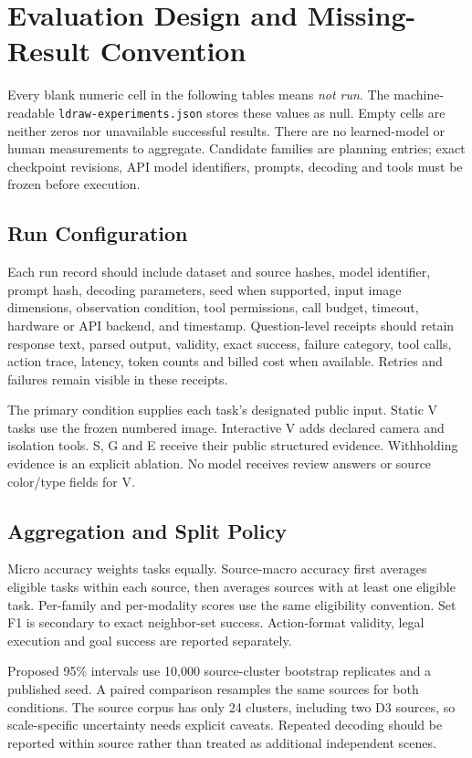 \documentclass[10pt,letterpaper]{article}
\begin{document}
\section{Evaluation Design and Missing-Result Convention}
Every blank numeric cell in the following tables means \emph{not run}.
The machine-readable \texttt{ldraw-experiments.json} stores these values
as null. Empty cells are neither zeros nor unavailable successful
results. There are no learned-model or human measurements to aggregate.
Candidate families are planning entries; exact checkpoint revisions,
API model identifiers, prompts, decoding and tools must be frozen
before execution.

\subsection{Run Configuration}
Each run record should include dataset and source hashes, model
identifier, prompt hash, decoding parameters, seed when supported,
input image dimensions, observation condition, tool permissions,
call budget, timeout, hardware or API backend, and timestamp.
Question-level receipts should retain response text, parsed output,
validity, exact success, failure category, tool calls, action trace,
latency, token counts and billed cost when available. Retries and
failures remain visible in these receipts.

The primary condition supplies each task's designated public input.
Static V tasks use the frozen numbered image. Interactive V adds
declared camera and isolation tools. S, G and E receive their public
structured evidence. Withholding evidence is an explicit ablation.
No model receives review answers or source color/type fields for V.

\subsection{Aggregation and Split Policy}
Micro accuracy weights tasks equally. Source-macro accuracy first
averages eligible tasks within each source, then averages sources with
at least one eligible task. Per-family and per-modality scores use the
same eligibility convention. Set F1 is secondary to exact neighbor-set
success. Action-format validity, legal execution and goal success are
reported separately.

Proposed 95\% intervals use 10,000 source-cluster bootstrap replicates
and a published seed. A paired comparison resamples the same sources
for both conditions. The source corpus has only 24 clusters, including
two D3 sources, so scale-specific uncertainty needs explicit caveats.
Repeated decoding should be reported within source rather than treated
as additional independent scenes.
\end{document}

